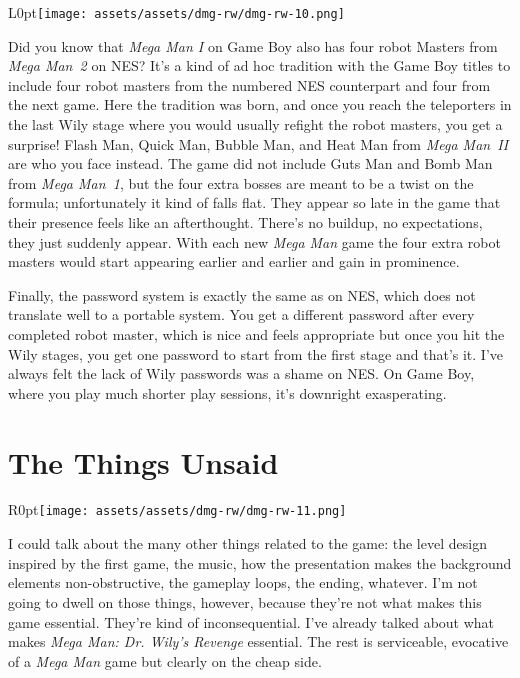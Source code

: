 \documentclass{book}
\begin{document}
\begin{wrapfigure}{L}{0pt}{\texttt{[image: assets/assets/dmg-rw/dmg-rw-10.png]}}\end{wrapfigure}\noindent
Did you know that \emph{Mega Man I} on Game Boy also has four robot Masters from \emph{Mega Man~2} on NES? It’s a kind of ad hoc tradition with the Game Boy titles to include four robot masters from the numbered NES counterpart and four from the next game. Here the tradition was born, and once you reach the teleporters in the last Wily stage where you would usually refight the robot masters, you get a surprise! Flash Man, Quick Man, Bubble Man, and Heat Man from \emph{Mega Man~II} are who you face instead. The game did not include Guts Man and Bomb Man from \emph{Mega Man~1}, but the four extra bosses are meant to be a twist on the formula; unfortunately it kind of falls flat. They appear so late in the game that their presence feels like an afterthought. There’s no buildup, no expectations, they just suddenly appear. With each new \emph{Mega Man} game the four extra robot masters would start appearing earlier and earlier and gain in prominence.\par
Finally, the password system is exactly the same as on NES, which does not translate well to a portable system. You get a different password after every completed robot master, which is nice and feels appropriate but once you hit the Wily stages, you get one password to start from the first stage and that’s it. I’ve always felt the lack of Wily passwords was a shame on NES. On Game Boy, where you play much shorter play sessions, it’s downright exasperating.\par
\FloatBarrier\section*{The Things Unsaid}
\begin{wrapfigure}{R}{0pt}{\texttt{[image: assets/assets/dmg-rw/dmg-rw-11.png]}}\end{wrapfigure}
I could talk about the many other things related to the game: the level design inspired by the first game, the music, how the presentation makes the background elements non-obstructive, the gameplay loops, the ending, whatever. I’m not going to dwell on those things, however, because they’re not what makes this game essential. They’re kind of inconsequential. I’ve already talked about what makes \emph{Mega Man: Dr. Wily’s Revenge} essential. The rest is serviceable, evocative of a \emph{Mega Man} game but clearly on the cheap side.\par
\end{document}
